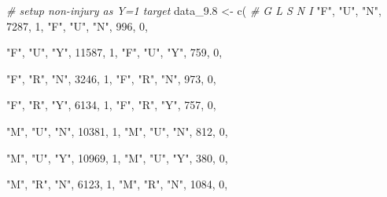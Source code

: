 \documentclass[
]{article}
\newenvironment{Shaded}{\begin{snugshade}}{\end{snugshade}}
\newcommand{\CommentTok}[1]{\textcolor[rgb]{0.56,0.35,0.01}{\textit{#1}}}
\newcommand{\DecValTok}[1]{\textcolor[rgb]{0.00,0.00,0.81}{#1}}
\newcommand{\FloatTok}[1]{\textcolor[rgb]{0.00,0.00,0.81}{#1}}
\newcommand{\FunctionTok}[1]{\textcolor[rgb]{0.00,0.00,0.00}{#1}}
\newcommand{\NormalTok}[1]{#1}
\newcommand{\OtherTok}[1]{\textcolor[rgb]{0.56,0.35,0.01}{#1}}
\newcommand{\StringTok}[1]{\textcolor[rgb]{0.31,0.60,0.02}{#1}}
\begin{document}
\begin{Shaded}
\begin{Highlighting}[]
\CommentTok{\# setup non{-}injury as Y=1 target}
\NormalTok{data\_9}\FloatTok{.8} \OtherTok{\textless{}{-}} \FunctionTok{c}\NormalTok{(}
  \CommentTok{\# G   L    S   N     I}
  \StringTok{"F"}\NormalTok{, }\StringTok{"U"}\NormalTok{, }\StringTok{"N"}\NormalTok{, }\DecValTok{7287}\NormalTok{, }\DecValTok{1}\NormalTok{,}
  \StringTok{"F"}\NormalTok{, }\StringTok{"U"}\NormalTok{, }\StringTok{"N"}\NormalTok{, }\DecValTok{996}\NormalTok{, }\DecValTok{0}\NormalTok{,}
  
  \StringTok{"F"}\NormalTok{, }\StringTok{"U"}\NormalTok{, }\StringTok{"Y"}\NormalTok{, }\DecValTok{11587}\NormalTok{, }\DecValTok{1}\NormalTok{,}
  \StringTok{"F"}\NormalTok{, }\StringTok{"U"}\NormalTok{, }\StringTok{"Y"}\NormalTok{, }\DecValTok{759}\NormalTok{, }\DecValTok{0}\NormalTok{,}
  
  \StringTok{"F"}\NormalTok{, }\StringTok{"R"}\NormalTok{, }\StringTok{"N"}\NormalTok{, }\DecValTok{3246}\NormalTok{, }\DecValTok{1}\NormalTok{,}
  \StringTok{"F"}\NormalTok{, }\StringTok{"R"}\NormalTok{, }\StringTok{"N"}\NormalTok{, }\DecValTok{973}\NormalTok{, }\DecValTok{0}\NormalTok{,}
  
  \StringTok{"F"}\NormalTok{, }\StringTok{"R"}\NormalTok{, }\StringTok{"Y"}\NormalTok{, }\DecValTok{6134}\NormalTok{, }\DecValTok{1}\NormalTok{,}
  \StringTok{"F"}\NormalTok{, }\StringTok{"R"}\NormalTok{, }\StringTok{"Y"}\NormalTok{, }\DecValTok{757}\NormalTok{, }\DecValTok{0}\NormalTok{,}
  
  
  \StringTok{"M"}\NormalTok{, }\StringTok{"U"}\NormalTok{, }\StringTok{"N"}\NormalTok{, }\DecValTok{10381}\NormalTok{, }\DecValTok{1}\NormalTok{,}
  \StringTok{"M"}\NormalTok{, }\StringTok{"U"}\NormalTok{, }\StringTok{"N"}\NormalTok{, }\DecValTok{812}\NormalTok{, }\DecValTok{0}\NormalTok{,}
  
  \StringTok{"M"}\NormalTok{, }\StringTok{"U"}\NormalTok{, }\StringTok{"Y"}\NormalTok{, }\DecValTok{10969}\NormalTok{, }\DecValTok{1}\NormalTok{,}
  \StringTok{"M"}\NormalTok{, }\StringTok{"U"}\NormalTok{, }\StringTok{"Y"}\NormalTok{, }\DecValTok{380}\NormalTok{, }\DecValTok{0}\NormalTok{,}
  
  \StringTok{"M"}\NormalTok{, }\StringTok{"R"}\NormalTok{, }\StringTok{"N"}\NormalTok{, }\DecValTok{6123}\NormalTok{, }\DecValTok{1}\NormalTok{,}
  \StringTok{"M"}\NormalTok{, }\StringTok{"R"}\NormalTok{, }\StringTok{"N"}\NormalTok{, }\DecValTok{1084}\NormalTok{, }\DecValTok{0}\NormalTok{,}
  

\end{Highlighting}
\end{Shaded}
\end{document}
